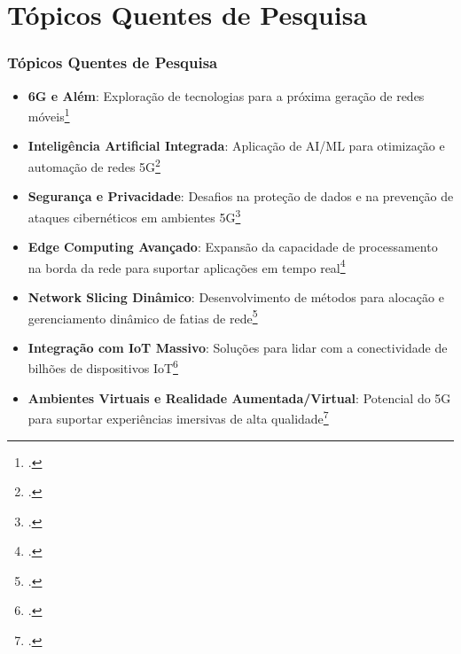 
\section{Tópicos Quentes de Pesquisa}
\begin{frame}[allowframebreaks]
    \frametitle{Tópicos Quentes de Pesquisa}
    \begin{itemize}
        \item \textbf{6G e Além}: Exploração de tecnologias para a próxima geração de redes móveis\footcite{6G_beyond}
        \item \textbf{Inteligência Artificial Integrada}: Aplicação de AI/ML para otimização e automação de redes 5G\footcite{AI_5G}
        \item \textbf{Segurança e Privacidade}: Desafios na proteção de dados e na prevenção de ataques cibernéticos em ambientes 5G\footcite{Security_5G}
        \item \textbf{Edge Computing Avançado}: Expansão da capacidade de processamento na borda da rede para suportar aplicações em tempo real\footcite{MEC_5G}
        \item \textbf{Network Slicing Dinâmico}: Desenvolvimento de métodos para alocação e gerenciamento dinâmico de fatias de rede\footcite{Dynamic_NS}
        \item \textbf{Integração com IoT Massivo}: Soluções para lidar com a conectividade de bilhões de dispositivos IoT\footcite{Massive_IoT}
        \item \textbf{Ambientes Virtuais e Realidade Aumentada/Virtual}: Potencial do 5G para suportar experiências imersivas de alta qualidade\footcite{ARVR_5G}
    \end{itemize}
\end{frame}